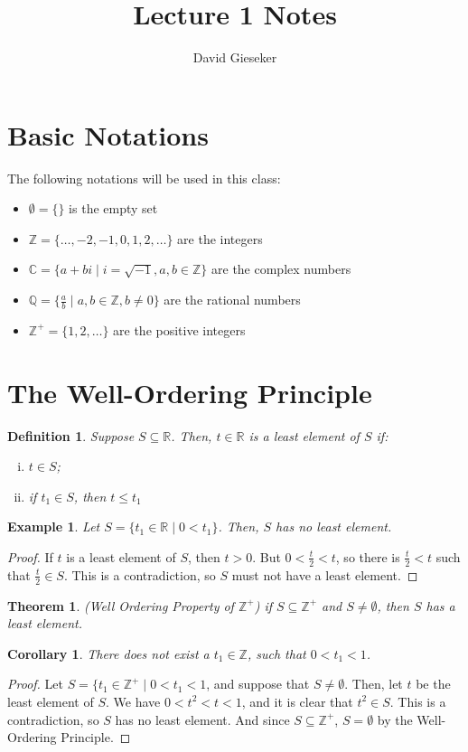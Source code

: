 \documentclass{article}
\begin{document}
\title{Lecture 1 Notes}
\author{David Gieseker}
\maketitle

\newtheorem*{theorem}{Theorem}
\newtheorem*{corollary}{Corollary}
\newtheorem*{lemma}{Lemma}
\newtheorem*{definition}{Definition}
\newtheorem*{example}{Example}

\section{Basic Notations}
The following notations will be used in this class:
\begin{itemize}
	\item $\emptyset = \{\}$ is the empty set
	\item $\mathbb{Z} = \{\dots, -2, -1, 0, 1, 2, \dots\}$ are the integers
	\item $\mathbb{C} = \{a+bi \mid i=\sqrt{-1}, a,b\in\mathbb{Z}\}$ are the complex numbers
	\item $\mathbb{Q} = \{\frac{a}{b} \mid a,b\in\mathbb{Z}, b\neq0\}$ are the rational numbers
	\item $\mathbb{Z}^+ = \{1,2,\dots\}$ are the positive integers
\end{itemize}

\section{The Well-Ordering Principle}
\begin{definition}
Suppose $S \subseteq \mathbb{R}$. Then, $t\in\mathbb{R}$ is a least element of $S$ if:
\begin{enumerate}[(i)]
	\item $t\in S$;
	\item if $t_1\in S$, then $t\leq t_1$
\end{enumerate}
\end{definition}
\begin{example}
Let $S=\{t_1\in\mathbb{R}\mid 0<t_1\}$. Then, $S$ has no least element. 
\end{example}
\begin{proof}
If $t$ is a least element of $S$, then $t>0$. But $0<\frac{t}{2}<t$, so there is $\frac{t}{2}<t$ such that $\frac{t}{2}\in S$. This is a contradiction, so $S$ must not have a least element. 
\end{proof}
\begin{theorem}
(Well Ordering Property of $\mathbb{Z}^+$) if $S\subseteq\mathbb{Z}^+$ and $S\neq\emptyset$, then $S$ has a least element. 
\end{theorem}
\begin{corollary}
There does not exist a $t_1 \in \mathbb{Z}$, such that $0<t_1<1$. 
\end{corollary}
\begin{proof}
Let $S=\{t_1\in\mathbb{Z}^+\mid0<t_1<1$, and suppose that $S\neq\emptyset$. Then, let $t$ be the least element of $S$. We have $0<t^2<t<1$, and it is clear that $t^2\in S$. This is a contradiction, so $S$ has no least element. And since $S\subseteq\mathbb{Z}^+$, $S=\emptyset$ by the Well-Ordering Principle. 
\end{proof}
\end{document}
